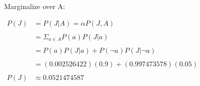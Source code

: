 \begin{enumerate}
	Marginalize over A:
	
	\(
		\begin{array}{ll}
			P(J) & = P(J | A) = \alpha P(J, A) \\ \\
			        & = \Sigma_{a \in A} P(a) P(J | a) \\ \\
			        & = P(a)P(J | a) + P(\neg a) P(J | \neg a) \\ \\
			        & = (0.002526422)(0.9) + (0.997473578)(0.05) \\ \\
			P(J) & \approx 0.0521474587
		\end{array}
	\)
\end{enumerate}



